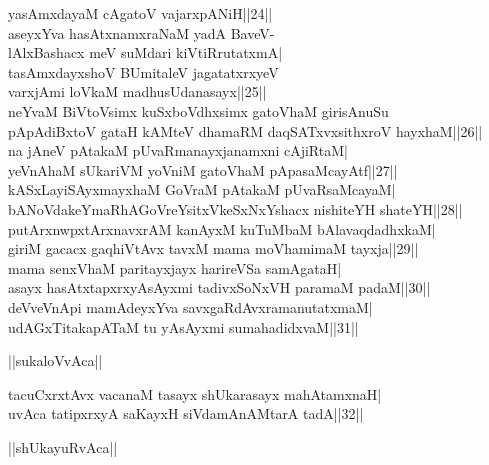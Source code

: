 \documentclass{article}
\begin{document}
yasAmxdayaM cAgatoV vajarxpANiH||24||\\
aseyxYva hasAtxnamxraNaM yadA BaveV-\\
lAlxBashacx meV suMdari kiVtiRrutatxmA|\\
tasAmxdayxshoV BUmitaleV jagatatxrxyeV\\
varxjAmi loVkaM madhusUdanasayx||25||\\
neYvaM BiVtoVsimx kuSxboVdhxsimx gatoVhaM girisAnuSu\\
pApAdiBxtoV gataH kAMteV dhamaRM daqSATxvxsithxroV hayxhaM||26||\\
na jAneV pAtakaM pUvaRmanayxjanamxni cAjiRtaM|\\
yeVnAhaM sUkariVM yoVniM gatoVhaM pApasaMcayAtf||27||\\
kASxLayiSAyxmayxhaM GoVraM pAtakaM pUvaRsaMcayaM|\\
bANoVdakeYmaRhAGoVreYsitxVkeSxNxYshacx nishiteYH shateYH||28||\\
putArxnwpxtArxnavxrAM kanAyxM kuTuMbaM bAlavaqdadhxkaM|\\
giriM gacacx gaqhiVtAvx tavxM mama moVhamimaM tayxja||29||\\
mama senxVhaM paritayxjayx harireVSa samAgataH|\\
asayx hasAtxtapxrxyAsAyxmi tadivxSoNxVH paramaM padaM||30||\\
deVveVnApi mamAdeyxYva savxgaRdAvxramanutatxmaM|\\
udAGxTitakapATaM tu yAsAyxmi sumahadidxvaM||31||\\

\begin{center}
||sukaloVvAca||
\end{center}

tacuCxrxtAvx vacanaM tasayx shUkarasayx mahAtamxnaH|\\
uvAca tatipxrxyA saKayxH siVdamAnAMtarA tadA||32||\\

\begin{center}
||shUkayuRvAca||
\end{center}
\end{document}
